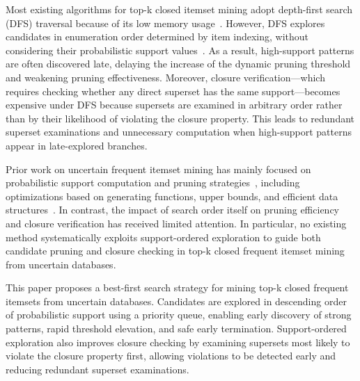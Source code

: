 \documentclass[10pt,letterpaper]{article}
\begin{document}
Most existing algorithms for top-k closed itemset mining adopt depth-first
search (DFS) traversal because of its low memory usage~\cite{bib11,bib13}.
However, DFS explores candidates in enumeration order determined by item
indexing, without considering their probabilistic support
values~\cite{bib8,bib13}. As a
result, high-support patterns are often discovered late, delaying the increase
of the dynamic pruning threshold and weakening pruning effectiveness. Moreover,
closure verification---which requires checking whether any direct superset has
the same support---becomes expensive under DFS because supersets are examined
in arbitrary order rather than by their likelihood of violating the closure
property. This leads to redundant superset examinations and unnecessary
computation when high-support patterns appear in late-explored branches.

Prior work on uncertain frequent itemset mining has mainly focused on
probabilistic support computation and pruning
strategies~\cite{bib4,bib9}, including optimizations based on generating
functions, upper bounds, and efficient data
structures~\cite{bib3,bib10,bib14}. In contrast, the impact of search order itself
on pruning efficiency and closure verification has received limited attention.
In particular, no existing method systematically exploits support-ordered
exploration to guide both candidate pruning and closure checking in top-k
closed frequent itemset mining from uncertain databases.

This paper proposes a best-first search strategy for mining top-k closed
frequent itemsets from uncertain databases. Candidates are explored in
descending order of probabilistic support using a priority queue, enabling
early discovery of strong patterns, rapid threshold elevation, and safe early
termination. Support-ordered exploration also improves closure checking by
examining supersets most likely to violate the closure property first, allowing
violations to be detected early and reducing redundant superset examinations.
\end{document}

